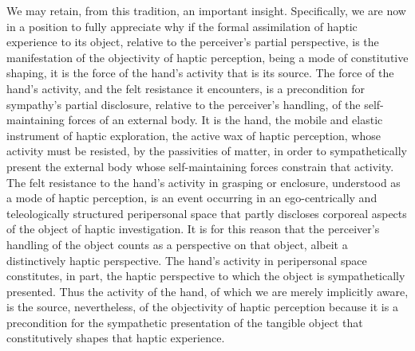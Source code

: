 We may retain, from this tradition, an important insight. Specifically, we are now in a position to fully appreciate why if the formal assimilation of haptic experience to its object, relative to the perceiver's partial perspective, is the manifestation of the objectivity of haptic perception, being a mode of constitutive shaping, it is the force of the hand's activity that is its source. The force of the hand's activity, and the felt resistance it encounters, is a precondition for sympathy's partial disclosure, relative to the perceiver's handling, of the self-maintaining forces of an external body. It is the hand, the mobile and elastic instrument of haptic exploration, the active wax of haptic perception, whose activity must be resisted, by the passivities of matter, in order to sympathetically present the external body whose self-maintaining forces constrain that activity. The felt resistance to the hand's activity in grasping or enclosure, understood as a mode of haptic perception, is an event occurring in an ego-centrically and teleologically structured peripersonal space that partly discloses corporeal aspects of the object of haptic investigation. It is for this reason that the perceiver's handling of the object counts as a perspective on that object, albeit a distinctively haptic perspective. The hand's activity in peripersonal space constitutes, in part, the haptic perspective to which the object is sympathetically presented. Thus the activity of the hand, of which we are merely implicitly aware, is the source, nevertheless, of the objectivity of haptic perception because it is a precondition for the sympathetic presentation of the tangible object that constitutively shapes that haptic experience.






